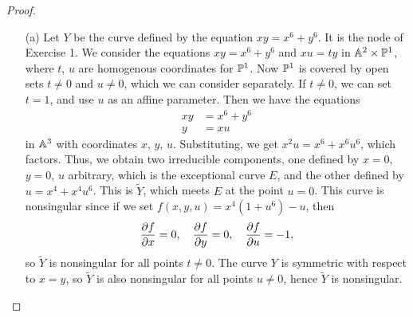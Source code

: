 \documentclass{article}
\begin{document}
\begin{enumerate} [label=\textbf{\arabic*.}, leftmargin=0cm]
\begin{proof} $ $ \vspace{0pt}
    \begin{itemize} [leftmargin=0cm]
        \item[(a)] Let $Y$ be the curve defined by the equation $xy = x^6 + y^6$. It is the node of Exercise 1. We consider the equations $xy = x^6 + y^6$ and $xu = ty$ in $\mathbb{A}^2 \times \mathbb{P}^1$, where $t$, $u$ are homogenous coordinates for $\mathbb{P}^1$. Now $\mathbb{P}^1$ is covered by open sets $t \neq 0$ and $u \neq 0$, which we can consider separately. If $t \neq 0$, we can set $t = 1$, and use $u$ as an affine parameter. Then we have the equations
        \begin{align*}
            xy & = x^6 + y^6 \\
            y & = xu
        \end{align*}
        in $\mathbb{A}^3$ with coordinates $x$, $y$, $u$. Substituting, we get $x^2 u = x^6 + x^6 u^6$, which factors. Thus, we obtain two irreducible components, one defined by $x = 0$, $y = 0$, $u$ arbitrary, which is the exceptional curve $E$, and the other defined by $u = x^4 + x^4 u^6$. This is $\widetilde{Y}$, which meets $E$ at the point $u = 0$. This curve is nonsingular since if we set $f(x, y, u) = x^4(1 + u^6) - u$, then
        \begin{equation*}
            \pdv{f}{x}(O) = 0, \quad \pdv{f}{y}(O) = 0, \quad \pdv{f}{u}(O) = -1,
        \end{equation*}
        so $\widetilde{Y}$ is nonsingular for all points $t \neq 0$. The curve $Y$ is symmetric with respect to $x = y$, so $\widetilde{Y}$ is also nonsingular for all points $u \neq 0$, hence $\widetilde{Y}$ is nonsingular.


\end{itemize}
\end{proof}
\end{enumerate}
\end{document}
